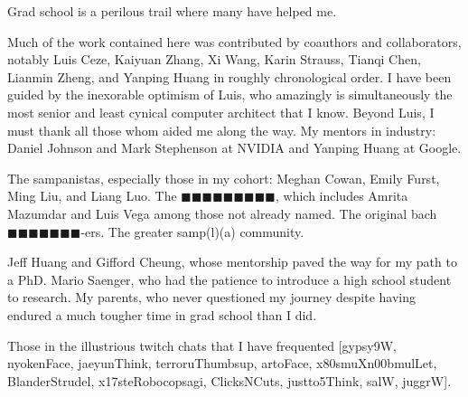 Grad school is a perilous trail where many have helped me.

Much of the work contained here was contributed by coauthors and collaborators, notably Luis Ceze, Kaiyuan Zhang, Xi Wang, Karin Strauss, Tianqi Chen, Lianmin Zheng, and Yanping Huang in roughly chronological order.
I have been guided by the inexorable optimism of Luis, who amazingly is simultaneously the most senior and least cynical computer architect that I know.
Beyond Luis, I must thank all those whom aided me along the way.
My mentors in industry: Daniel Johnson and Mark Stephenson at NVIDIA and Yanping Huang at Google.

The sampanistas, especially those in my cohort: Meghan Cowan, Emily Furst, Ming Liu, and Liang Luo.
The $\blacksquare \blacksquare \blacksquare \blacksquare \blacksquare \blacksquare \blacksquare \blacksquare \blacksquare $, which includes Amrita Mazumdar and Luis Vega among those not already named.
The original bach$\blacksquare \blacksquare \blacksquare \blacksquare \blacksquare \blacksquare \blacksquare $-ers. %
The greater samp(l)(a) community.

Jeff Huang and Gifford Cheung, whose mentorship paved the way for my path to a PhD.
Mario Saenger, who had the patience to introduce a high school student to research.
My parents, who never questioned my journey despite having endured a much tougher time in grad school than I did.

Those in the illustrious twitch chats that I have frequented [gypsy9W, nyokenFace, jaeyunThink, terroruThumbsup, artoFace, x80smuXn00bmulLet, BlanderStrudel, x17steRobocopsagi, ClicksNCuts, justto5Think, salW, juggrW].

